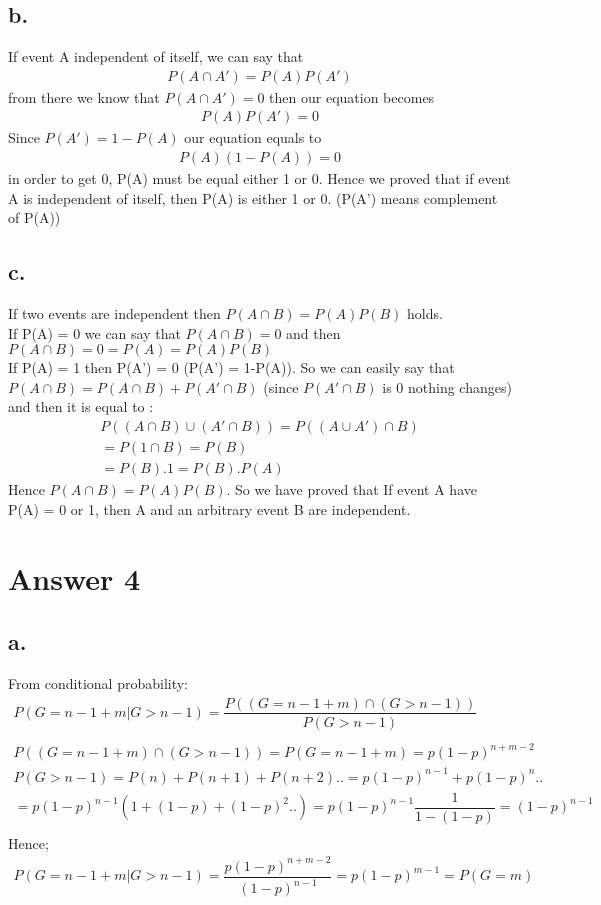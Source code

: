 \documentclass[12pt]{article}
\begin{document}
\subsection*{b.}
If event A independent of itself, we can say that \\
\begin{gather*} 
P(A \cap A') = P(A)P(A')
\end{gather*}
from there we know that $P(A \cap A') = 0$ then our equation becomes 
\begin{gather*}
P(A)P(A') = 0
\end{gather*}
Since $P(A') = 1 - P(A)$ our equation equals to
\begin{gather*}
P(A)(1-P(A)) = 0
\end{gather*}
in order to get 0, P(A) must be equal either 1 or 0. Hence we proved that if event A is  independent of itself, then P(A) is either 1 or 0. (P(A') means complement of P(A)) 
\subsection*{c.}
If two events are independent then $P(A\cap B) = P(A)P(B)$ holds. \\
If P(A) = 0 we can say that $P(A\cap B) = 0$ and then $P(A \cap B) = 0 = P(A) = P(A)P(B)$ \\
If P(A) = 1 then P(A') = 0 (P(A') = 1-P(A)). So we can easily say that $P(A\cap B) = P(A \cap B) + P(A' \cap B)$ (since $P(A' \cap B)$ is 0 nothing changes) and then it is equal to :
\begin{gather*}
P((A \cap B) \cup (A' \cap B)) = P((A\cup A')\cap B) \\
=P(1 \cap B) = P(B) \\
=P(B).1 = P(B).P(A)
\end{gather*}
Hence $P(A \cap B) = P(A)P(B)$. So we have proved that If event A have P(A) = 0 or 1, then A and an arbitrary event B are independent.
\section*{Answer 4}

\subsection*{a.}
From conditional probability: 
\begin{gather*}
P(G = n-1+m | G > n-1 ) = \dfrac{P((G = n-1+m )\cap (G > n-1))}{P(G > n-1)} \\ \\
P((G = n-1+m )\cap (G > n-1)) = P(G = n-1+m) = p(1-p)^{n+m-2} \\
P(G > n-1) = P(n) + P(n+1) + P(n+2).. = p(1-p)^{n-1}+p(1-p)^{n}.. \\
=  p(1-p)^{n-1}(1+(1-p)+(1-p)^2..) = p(1-p)^{n-1}\dfrac{1}{1-(1-p)}=(1-p)^{n-1} \\
\end{gather*}
Hence;
\begin{gather*}
P(G = n-1+m | G > n-1 ) = \dfrac{p(1-p)^{n+m-2}}{(1-p)^{n-1}} =p(1-p)^{m-1} = P(G=m)
\end{gather*}
\end{document}
